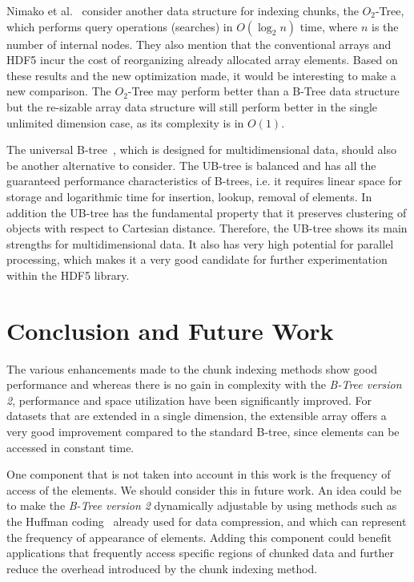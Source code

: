 Nimako et al.~\cite{Nimako2012} consider another data structure for indexing
chunks, the $O_{2}$-Tree, which performs query operations (searches) in
$O(\log_{2}{n})$ time, where $n$ is the number of internal nodes. They also
mention that the conventional arrays and HDF5 incur the cost
of reorganizing already allocated array elements.
Based on these results and the new optimization made, it would be
interesting to make a new comparison. The $O_{2}$-Tree may perform
better than a B-Tree data structure but the re-sizable array data structure
will still perform better in the single unlimited dimension case, as its
complexity is in $O(1)$.

The universal B-tree~\cite{Bayer1997}, which is designed for multidimensional
data, should also be another alternative to consider. The UB-tree is balanced
and has all the guaranteed performance characteristics of B-trees, i.e.
it requires linear space for storage and logarithmic time for insertion, lookup,
removal of elements. In addition the UB-tree has the fundamental property that
it preserves clustering of objects with respect to Cartesian distance.
Therefore, the UB-tree shows its main strengths for multidimensional data.
It also has very high potential for parallel processing, which makes it a very
good candidate for further experimentation within the HDF5 library.

\section{Conclusion and Future Work}
\label{sec:conclusion}

The various enhancements made to the chunk indexing methods show good performance
and whereas there is no gain in complexity with the \textit{B-Tree version 2},
performance and space utilization have been significantly improved. For datasets that are
extended in a single dimension, the extensible array offers a very good
improvement compared to the standard B-tree, since elements can be accessed
in constant time.

One component that is not taken into account in this work is the frequency
of access of the elements. We should consider this in future work. An idea
could be to make the \textit{B-Tree version 2} dynamically adjustable by using
methods such as the Huffman coding~\cite{Huffman1952} already used for data
compression, and which can represent the frequency of appearance of elements.
Adding this component could benefit applications that frequently access specific
regions of chunked data and further reduce the overhead introduced by the chunk
indexing method.


